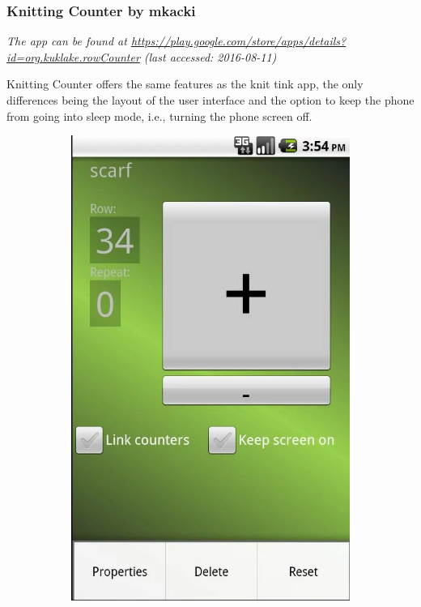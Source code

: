 \subsubsection*{Knitting Counter by mkacki}

\textit{ The app can be found at \url{https://play.google.com/store/apps/details?id=org.kuklake.rowCounter} \small{(last accessed: 2016-08-11)}}
\vspace*{0.5cm}

\noindent Knitting Counter offers the same features as the knit tink app, the only differences being the layout of the user interface and the option to keep the phone from going into sleep mode, i.e., turning the phone screen off.

\begin{figure}[H]
  \centering
    \begin{subfigure}[b]{0.33\textwidth}
      \centering
        \includegraphics[width=0.95\linewidth]{images/image12.png}

\end{subfigure}
\end{figure}
